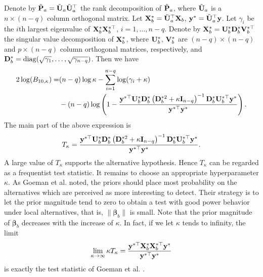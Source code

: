 \documentclass[bj]{imsart}
\DeclareMathOperator{\mydiag}{diag}
\newcommand{\By}{\mathbf{y}}    \newcommand{\Bz}{\mathbf{z}}
\newcommand{\bfsym}[1]{\ensuremath{\boldsymbol{#1}}}
\def\bbeta{\bfsym \beta}
\theoremstyle{plain}
\theoremstyle{definition}
\theoremstyle{remark}
\begin{document}
Denote by $\tilde {\mathbf{P}}_a=\tilde{\mathbf{U}}_a \tilde{\mathbf{U}}_a^\top$ the rank decomposition of $\tilde {\mathbf{P}}_a$, where $\tilde{\mathbf{U}}_a$ is a $n\times (n-q)$ column orthogonal matrix.
Let $\mathbf{X}_b^* = \tilde{\mathbf{U}}_a^\top \mathbf{X}_b$, $\By^* =\tilde \BU_a^\top \By$.
Let $\gamma_i$ be the $i$th largest eigenvalue of $\mathbf{X}^*_b \mathbf{X}_b^{*\top}$, $i=1,\ldots, n-q$.
Denote by $\mathbf{X}_b^* =\mathbf{U}_{b}^* \mathbf{D}_{b}^* \mathbf{V}_b^{*\top}$ the singular value decomposition of $\mathbf{X}_{b}^*$, where  $\mathbf{U}_{b}^*$, $\mathbf{V}_b^*$ are $(n-q)\times (n-q)$ and $p\times (n-q)$ column orthogonal matrices, respectively, and $\BD_{b}^*=\mydiag (\sqrt {\gamma_1},\ldots, \sqrt{\gamma_{n-q}})$.
Then we have
\begin{equation*}
    \begin{split}
        2\log (B_{10,\kappa})
        =&
        (n-q)\log \kappa - \sum_{i=1}^{n-q}\log ( \gamma_i + \kappa )
        \\
         &-(n-q)\log\left(1-\frac{\By^{*\top} \BU_b^*  \BD_b^{*} \left(  \BD_b^{*2} + \kappa \BI_{n-q} \right)^{-1} \BD_b^{*}   \BU_b^{*\top} \By^* }{\By^{*\top} \By^*}\right)
         .
    \end{split}
\end{equation*}
The main part of the above expression is
\begin{equation*}
    T_{\kappa} = \frac{\By^{*\top} \BU_b^*  \BD_b^{*} \left(  \BD_b^{*2} + \kappa \BI_{n-q} \right)^{-1} \BD_b^{*}   \BU_b^{*\top} \By^* }{\By^{*\top} \By^*}.
\end{equation*}
A large value of $T_{\kappa}$ supports the alternative hypothesis.
Hence $T_{\kappa}$ can be regarded as a frequentist test statistic.
It remains to choose an appropriate hyperparameter $\kappa$.
As Goeman {\rm et al.} \cite{Goeman2006} noted, the priors should place most probability on the alternatives which are perceived as more interesting to detect.
Their strategy is to let the prior magnitude tend to zero to obtain a test with good power behavior under local alternatives, that is, $\|\bbeta_b\|$ is small.
Note that the prior magnitude of $\bbeta_b$ decreases with the increase of $\kappa$.
In fact, if we let $\kappa$ tends to infinity, the limit
\begin{equation*}
    \lim_{\kappa\to \infty} \kappa T_{\kappa} = \frac{\By^{*\top} \BX_b^* \BX_b^{*\top} \By^* }{\By^{*\top} \By^*}
\end{equation*}
is exactly the test statistic of Goeman {\rm et al.} \cite{Goeman2006}.
\end{document}
